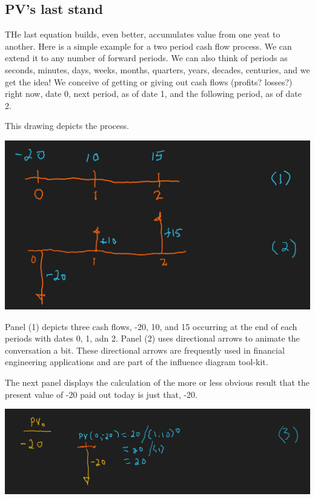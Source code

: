 \documentclass[
]{book}
\begin{document}
\hypertarget{pvs-last-stand}{%
\subsection{PV's last stand}\label{pvs-last-stand}}

THe last equation builds, even better, accumulates value from one yeat to another. Here is a simple example for a two period cash flow process. We can extend it to any number of forward periods. We can also think of periods as seconds, minutes, days, weeks, months, quarters, years, decades, centuries, and we get the idea! We conceive of getting or giving out cash flows (profits? losses?) right now, date 0, next period, as of date 1, and the following period, as of date 2.

This drawing depicts the process.

\includegraphics{images/02/pie-pv-dwg1.jpg}

Panel (1) depicts three cash flows, -20, 10, and 15 occurring at the end of each periods with dates 0, 1, adn 2. Panel (2) uses directional arrows to animate the conversation a bit. These directional arrows are frequently used in financial engineering applications and are part of the influence diagram tool-kit.

The next panel displays the calculation of the more or less obvious result that the present value of -20 paid out today is just that, -20.

\includegraphics{images/02/pie-pv-dwg2.jpg}
\end{document}
